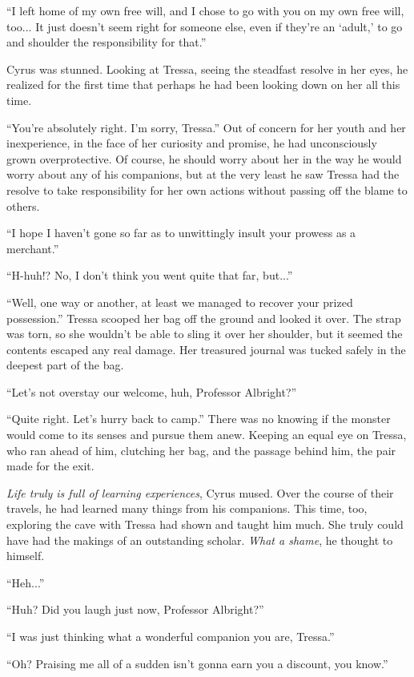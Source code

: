 ``I left home of my own free will, and I chose to go with you on my own free will, too... It just doesn't seem right for someone else, even if they're an `adult,' to go and shoulder the responsibility for that.''

Cyrus was stunned. Looking at Tressa, seeing the steadfast resolve in her eyes, he realized for the first time that perhaps he had been looking down on her all this time.

``You're absolutely right. I'm sorry, Tressa.'' Out of concern for her youth and her inexperience, in the face of her curiosity and promise, he had unconsciously grown overprotective. Of course, he should worry about her in the way he would worry about any of his companions, but at the very least he saw Tressa had the resolve to take responsibility for her own actions without passing off the blame to others.

``I hope I haven't gone so far as to unwittingly insult your prowess as a merchant.''

``H-huh!? No, I don't think you went quite that far, but...''

``Well, one way or another, at least we managed to recover your prized possession.'' Tressa scooped her bag off the ground and looked it over. The strap was torn, so she wouldn't be able to sling it over her shoulder, but it seemed the contents escaped any real damage. Her treasured journal was tucked safely in the deepest part of the bag.

``Let's not overstay our welcome, huh, Professor Albright?''

``Quite right. Let's hurry back to camp.'' There was no knowing if the monster would come to its senses and pursue them anew. Keeping an equal eye on Tressa, who ran ahead of him, clutching her bag, and the passage behind him, the pair made for the exit.

\emph{Life truly is full of learning experiences}, Cyrus mused. Over the course of their travels, he had learned many things from his companions. This time, too, exploring the cave with Tressa had shown and taught him much. She truly could have had the makings of an outstanding scholar. \emph{What a shame}, he thought to himself.

``Heh...''

``Huh? Did you laugh just now, Professor Albright?''

``I was just thinking what a wonderful companion you are, Tressa.''

``Oh? Praising me all of a sudden isn't gonna earn you a discount, you know.''

